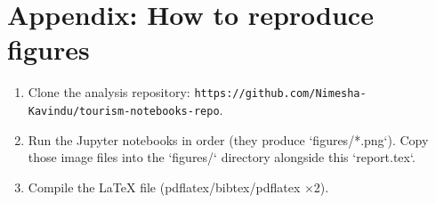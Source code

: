 \documentclass[12pt,a4paper]{article}
\begin{document}
\section{Appendix: How to reproduce figures}
\begin{enumerate}
  \item Clone the analysis repository: \verb|https://github.com/Nimesha-Kavindu/tourism-notebooks-repo|.
  \item Run the Jupyter notebooks in order (they produce `figures/*.png`). Copy those image files into the `figures/` directory alongside this `report.tex`.
  \item Compile the LaTeX file (pdflatex/bibtex/pdflatex ×2).
\end{enumerate}
\end{document}
